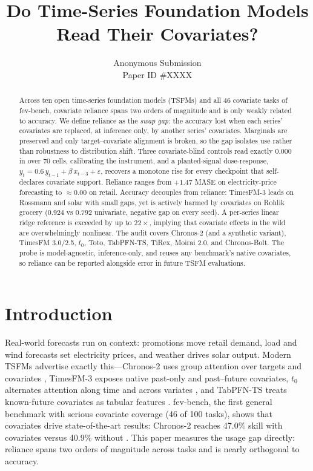 \documentclass[letterpaper]{article}
\title{Do Time-Series Foundation Models Read Their Covariates?}
\author{Anonymous Submission\\Paper ID \#XXXX}
\begin{document}
\maketitle

\begin{abstract}
Across ten open time-series foundation models (TSFMs) and all 46 covariate tasks of
fev-bench, covariate reliance spans two orders of magnitude and is only weakly related
to accuracy. We define reliance as the \emph{swap gap}: the accuracy lost when each
series' covariates are replaced, at inference only, by another series' covariates.
Marginals are preserved and only target--covariate alignment is broken, so the gap
isolates use rather than robustness to distribution shift. Three covariate-blind
controls read exactly $0.000$ in over 70 cells, calibrating the instrument, and a
planted-signal dose-response, $y_t = 0.6\,y_{t-1} + \beta\,x_{t-3} + \varepsilon$,
recovers a monotone rise for every checkpoint that self-declares covariate support.
Reliance ranges from $+1.47$ MASE on electricity-price forecasting to $\approx 0.00$
on retail. Accuracy decouples from reliance: TimesFM-3 leads on Rossmann and solar
with small gaps, yet is actively harmed by covariates on Rohlik grocery ($0.924$ vs
$0.792$ univariate, negative gap on every seed). A per-series linear ridge reference
is exceeded by up to $22\times$, implying that covariate effects in the wild are
overwhelmingly nonlinear. The audit covers Chronos-2 (and a synthetic variant),
TimesFM 3.0/2.5, $t_0$, Toto, TabPFN-TS, TiRex, Moirai 2.0, and Chronos-Bolt. The probe
is model-agnostic, inference-only, and reuses any benchmark's native covariates, so
reliance can be reported alongside error in future TSFM evaluations.
\end{abstract}

\section{Introduction}
Real-world forecasts run on context: promotions move retail demand, load and wind
forecasts set electricity prices, and weather drives solar output. Modern TSFMs
advertise exactly this---Chronos-2 uses group attention over targets and covariates
\citep{ansari2025chronos2}, TimesFM-3 exposes native past-only and past--future
covariates, $t_0$ alternates attention along time and across variates
\citep{meyer2026t0}, and TabPFN-TS treats known-future covariates as tabular features
\citep{hoo2025tabpfn}. fev-bench, the first general benchmark with serious covariate
coverage (46 of 100 tasks), shows that covariates drive state-of-the-art results:
Chronos-2 reaches 47.0\% skill with covariates versus 40.9\% without
\citep{shchur2025fev}. This paper measures the usage gap directly: reliance spans two
orders of magnitude across tasks and is nearly orthogonal to accuracy.
\end{document}
